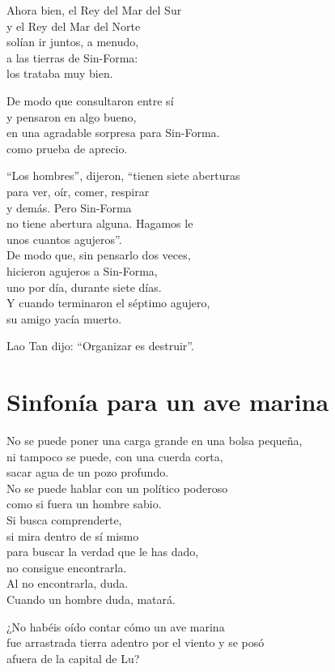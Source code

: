 \documentclass[book,b5paper,hidelinks,final]{memoir}
\begin{document}
	Ahora bien, el Rey del Mar del Sur\\
	y el Rey del Mar del Norte\\
	solían ir juntos, a menudo,\\
	a las tierras de Sin-Forma:\\
	los trataba muy bien.
	
	De modo que consultaron entre sí\\
	y pensaron en algo bueno,\\
	en una agradable sorpresa para Sin-Forma.\\
	como prueba de aprecio.
	
	``Los hombres'', dijeron, ``tienen siete aberturas\\
	para ver, oír, comer, respirar\\
	y demás. Pero Sin-Forma\\
	no tiene abertura alguna. Hagamos le\\
	unos cuantos agujeros''.\\
	De modo que, sin pensarlo dos veces,\\
	hicieron agujeros a Sin-Forma,\\
	uno por día, durante siete días.\\
	Y cuando terminaron el séptimo agujero,\\
	su amigo yacía muerto.
	
	Lao Tan dijo: ``Organizar es destruir''.
	
	\chapter*{Sinfonía para un ave marina}
	
	No se puede poner una carga grande en una bolsa pequeña,\\
	ni tampoco se puede, con una cuerda corta,\\
	sacar agua de un pozo profundo.\\
	No se puede hablar con un político poderoso\\
	como si fuera un hombre sabio.\\
	Si busca comprenderte,\\
	si mira dentro de sí mismo\\
	para buscar la verdad que le has dado,\\
	no consigue encontrarla.\\
	Al no encontrarla, duda.\\
	Cuando un hombre duda, matará.
	
	¿No habéis oído contar cómo un ave marina\\
	fue arrastrada tierra adentro por el viento y se posó\\
	afuera de la capital de Lu?
	
\end{document}

